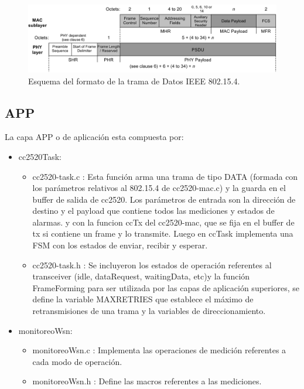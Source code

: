 {\vspace{20px}
\begin{figure}[h!]
	\centering
    \includegraphics[width=1\textwidth]{./Figures/data.jpg}
    	\caption{Esquema del formato de la trama de Datos IEEE 802.15.4.}
	\label{fig:data}
\end{figure}

\subsection{APP}
\label{subsec:app}
La capa APP	o de aplicación esta compuesta por:
\begin{itemize}
\item cc2520Task:
	\begin{itemize}
	\item cc2520-task.c : Esta función arma una trama de tipo DATA (formada con los parámetros relativos al 802.15.4 de cc2520-mac.c) y la guarda en el buffer de salida de cc2520. Los parámetros de entrada son la dirección de destino y el payload que contiene todos las mediciones y estados de alarmas. y con la funcion ccTx del cc2520-mac, que se fija en el buffer de tx si contiene un frame y lo transmite. Luego en ccTask implementa una FSM con los estados de enviar, recibir y esperar.
	\item cc2520-task.h : Se incluyeron los estados de operación referentes al transceiver (idle, dataRequest, waitingData, etc)y la función FrameForming para ser utilizada por las capas de aplicación superiores, se define la variable MAXRETRIES que establece el máximo de retransmisiones de una trama y la variables de direccionamiento.
	\end{itemize}
\item monitoreoWsn:	
	\begin{itemize}
	\item monitoreoWsn.c : Implementa las operaciones de medición referentes a cada modo de operación.
	\item monitoreoWsn.h : Define las macros referentes a las mediciones.
	\end{itemize}
\end{itemize}
}
